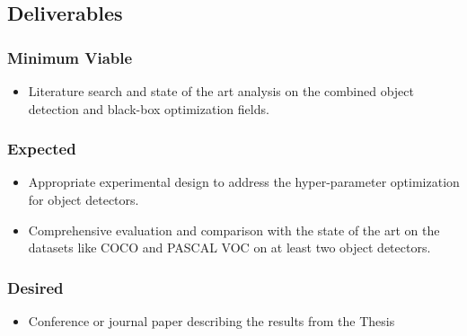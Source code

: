 \documentclass[thesis]{mas_proposal}
\begin{document}
\subsection{Deliverables}
\subsubsection*{Minimum Viable}

\begin{itemize}
    \item Literature search and state of the art analysis on the  combined object detection and black-box optimization  fields.

\end{itemize}

\subsubsection*{Expected}
\begin{itemize}
    \item Appropriate experimental design to address the hyper-parameter optimization for object detectors.
    \item Comprehensive evaluation and comparison with the state of the art on the datasets like COCO and PASCAL VOC on at least two object detectors.
\end{itemize}

\subsubsection*{Desired}
\begin{itemize}
    \item  Conference or journal paper describing the results from the Thesis
\end{itemize}


\nocite{*}

\end{document}
